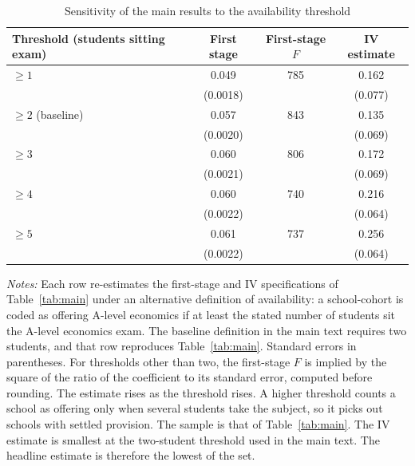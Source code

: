 \begin{table}[htbp]
\centering
\caption{Sensitivity of the main results to the availability threshold}
\label{tab:threshold_robustness}
\begin{tabular}{l ccc}
\toprule
Threshold (students sitting exam)  & First stage & First-stage $F$ & IV estimate \\
\midrule
$\geq 1$                           & 0.049       & 785             & 0.162       \\
                                   & (0.0018)    &                 & (0.077)     \\
\addlinespace
$\geq 2$ (baseline)                & 0.057       & 843             & 0.135       \\
                                   & (0.0020)    &                 & (0.069)     \\
\addlinespace
$\geq 3$                           & 0.060       & 806             & 0.172       \\
                                   & (0.0021)    &                 & (0.069)     \\
\addlinespace
$\geq 4$                           & 0.060       & 740             & 0.216       \\
                                   & (0.0022)    &                 & (0.064)     \\
\addlinespace
$\geq 5$                           & 0.061       & 737             & 0.256       \\
                                   & (0.0022)    &                 & (0.064)     \\
\bottomrule
\end{tabular}
\begin{minipage}{\textwidth}
\smallskip
\footnotesize
\textit{Notes:} Each row re-estimates the first-stage and IV specifications of Table~\ref{tab:main} under an alternative definition of availability: a school-cohort is coded as offering A-level economics if at least the stated number of students sit the A-level economics exam. The baseline definition in the main text requires two students, and that row reproduces Table~\ref{tab:main}. Standard errors in parentheses. For thresholds other than two, the first-stage $F$ is implied by the square of the ratio of the coefficient to its standard error, computed before rounding. The estimate rises as the threshold rises. A higher threshold counts a school as offering only when several students take the subject, so it picks out schools with settled provision. The sample is that of Table~\ref{tab:main}. The IV estimate is smallest at the two-student threshold used in the main text. The headline estimate is therefore the lowest of the set.
\end{minipage}
\end{table}
